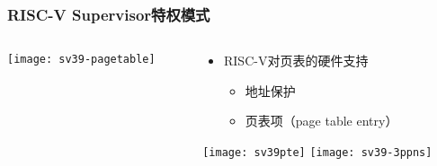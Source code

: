 \begin{frame}   
	\frametitle{RISC-V Supervisor特权模式}
	
	\begin{columns}[t]
		
		\begin{column}{.5\textwidth}
			
			\texttt{[image: sv39-pagetable]}
			
		\end{column}
		
		
		\begin{column}{.5\textwidth}
			
			\begin{itemize}\large
				\item RISC-V对页表的硬件支持
				\begin{itemize}
					\item 地址保护
					\item 页表项（page table entry）
					
					
				\end{itemize}
			\end{itemize}
			\texttt{[image: sv39pte]}
			\texttt{[image: sv39-3ppns]}
			

			
		\end{column}
		
		
	\end{columns}
	
\end{frame}
